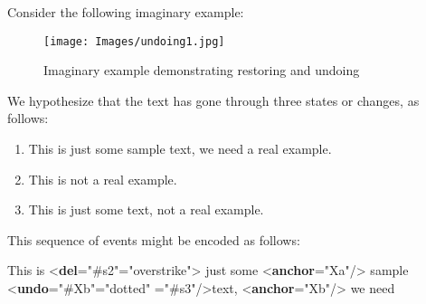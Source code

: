 Consider the following imaginary example: \begin{figure}[htbp]
\noindent\noindent\texttt{[image: Images/undoing1.jpg]}
\caption{Imaginary example demonstrating restoring and undoing}\end{figure}
 We hypothesize that the text has gone through three states or changes, as follows: \begin{enumerate}
\item This is just some sample text, we need a real example. 
\item This is not a real example.
\item This is just some text, not a real example.
\end{enumerate}\par
This sequence of events might be encoded as follows: \par\bgroup{}\exampleFont \begin{shaded}\noindent\mbox{} This is {<\textbf{del}\hspace*{1em}{change}="{\#s2}"\hspace*{1em}{rend}="{overstrike}">}\mbox{}\newline 
{}just some {<\textbf{anchor}\hspace*{1em}{xml:id}="{Xa}"/>} sample {<\textbf{undo}\hspace*{1em}{spanTo}="{\#Xb}"\hspace*{1em}{rend}="{dotted}"\mbox{}\newline 
\hspace*{1em}\hspace*{1em}{change}="{\#s3}"/>}text, {<\textbf{anchor}\hspace*{1em}{xml:id}="{Xb}"/>} we need\mbox{}\newline 

\end{shaded}
